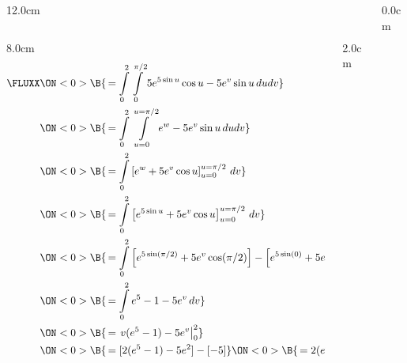 \begin{frame}
\begin{columns}\begin{column}{12.0cm}
\scriptsize
\begin{columns}
\begin{column}{8.0cm}
\begin{align*}
	\FLUXX 
	&\ON<0>{\B{\, = \int \limits_{0}^{2}\int \limits_{0}^{\pi/2} 5e^{5\sin u}\cos u - 5e^v\sin u \, dudv}} \\
	&\ON<0>{\B{\, = \int \limits_{0}^{2}\int \limits_{u=0}^{u=\pi/2} e^w - 5e^v\sin u\, dudv}} \\
	&\ON<0>{\B{\, = \int \limits_{0}^{2}\left[e^w + 5e^v\cos u \right]_{u=0}^{u=\pi/2} \, dv}} \\
	&\ON<0>{\B{\, = \int \limits_{0}^{2}\left[e^{5\sin u} + 5e^v\cos u \right]_{u=0}^{u=\pi/2} \, dv}} \\
	&\ON<0>{\B{\, = \int \limits_{0}^{2}\left[e^{5\sin (\pi/2)} + 5e^v\cos (\pi/2) \right]-\left[e^{5\sin (0)} + 5e^v\cos (0) \right] \, dv}} \\
	&\ON<0>{\B{\, = \int \limits_{0}^{2}e^{5}-1 - 5e^v \, dv}}\\
	&\ON<0>{\B{\, = \left.v(e^{5}-1) - 5e^v \right|_0^2}} \\
	&\ON<0>{\B{\, = [2(e^{5}-1) - 5e^2] - [-5]}}
	\ON<0>{\B{\, = 2(e^{5}-1) - 5e^2 + 5}}
\end{align*}
\end{column}
\begin{column}{2.0cm}
	\ON<0>{\B{$\D{w=5\sin u}$}}
	
	\vspace{0.2cm}
	
	
	\vspace{6.2cm}
	
\end{column}
\end{columns}

\vspace{4.2cm}

\end{column}\begin{column}{0.0cm}\end{column}\end{columns}
\end{frame}

